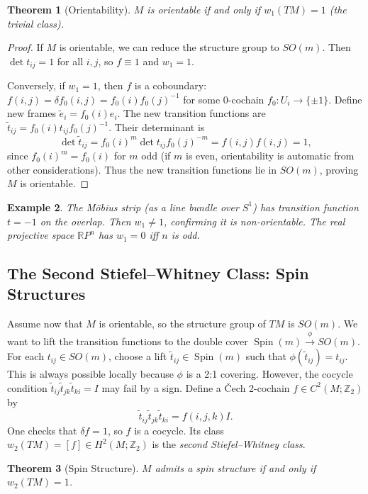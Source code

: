 \documentclass[11pt]{article}
\newcommand{\R}{\mathbb{R}}
\newcommand{\Z}{\mathbb{Z}}
\newtheorem{theorem}{Theorem}[section]
\newtheorem{example}[theorem]{Example}
\begin{document}
\begin{theorem}[Orientability]
\(M\) is orientable if and only if \(w_1(TM) = 1\) (the trivial class).
\end{theorem}

\begin{proof}
If \(M\) is orientable, we can reduce the structure group to \(SO(m)\). Then \(\det t_{ij} = 1\) for all \(i,j\), so \(f \equiv 1\) and \(w_1 = 1\).

Conversely, if \(w_1 = 1\), then \(f\) is a coboundary: \(f(i,j) = \delta f_0(i,j) = f_0(i)f_0(j)^{-1}\) for some 0-cochain \(f_0: U_i \to \{\pm 1\}\). Define new frames \(\tilde{e}_i = f_0(i) e_i\). The new transition functions are \(\tilde{t}_{ij} = f_0(i) t_{ij} f_0(j)^{-1}\). Their determinant is
\[
\det \tilde{t}_{ij} = f_0(i)^m \det t_{ij} f_0(j)^{-m} = f(i,j) f(i,j) = 1,
\]
since \(f_0(i)^m = f_0(i)\) for \(m\) odd (if \(m\) is even, orientability is automatic from other considerations). Thus the new transition functions lie in \(SO(m)\), proving \(M\) is orientable.
\end{proof}

\begin{example}
The Möbius strip (as a line bundle over \(S^1\)) has transition function \(t = -1\) on the overlap. Then \(w_1 \neq 1\), confirming it is non-orientable. The real projective space \(\R P^n\) has \(w_1 = 0\) iff \(n\) is odd.
\end{example}

\subsection{The Second Stiefel--Whitney Class: Spin Structures}
Assume now that \(M\) is orientable, so the structure group of \(TM\) is \(SO(m)\). We want to lift the transition functions to the double cover \(\operatorname{Spin}(m) \xrightarrow{\phi} SO(m)\). For each \(t_{ij} \in SO(m)\), choose a lift \(\tilde{t}_{ij} \in \operatorname{Spin}(m)\) such that \(\phi(\tilde{t}_{ij}) = t_{ij}\). This is always possible locally because \(\phi\) is a 2:1 covering. However, the cocycle condition \(\tilde{t}_{ij}\tilde{t}_{jk}\tilde{t}_{ki} = I\) may fail by a sign. Define a Čech 2-cochain \(f \in C^2(M;\Z_2)\) by
\[
\tilde{t}_{ij}\tilde{t}_{jk}\tilde{t}_{ki} = f(i,j,k) I.
\]
One checks that \(\delta f = 1\), so \(f\) is a cocycle. Its class \(w_2(TM) = [f] \in H^2(M;\Z_2)\) is the \emph{second Stiefel--Whitney class}.

\begin{theorem}[Spin Structure]
\(M\) admits a spin structure if and only if \(w_2(TM) = 1\).
\end{theorem}
\end{document}
